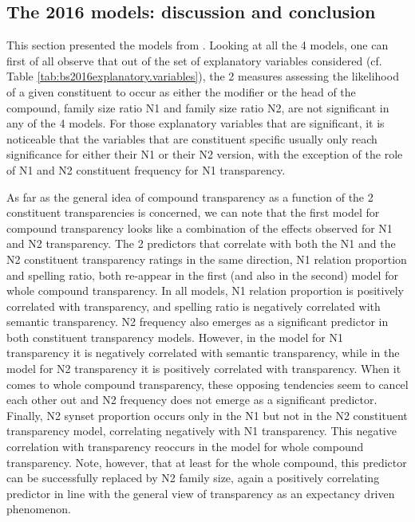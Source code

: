 \subsection{The 2016 models: discussion and conclusion}
\label{sec:bs2016discussionandconclusion}

This section presented the models from
\citet{BellandSchaefer:2016}. Looking at all the 4 models, one can
first of all observe that out of the set of explanatory variables
considered (cf. Table \ref{tab:bs2016explanatory.variables}), the 2
measures assessing the likelihood of a given constituent to occur as
either the modifier or the head of the compound, family size ratio N1
and family size ratio N2, are not significant in any of the 4 models. For those explanatory variables
that are significant, it is noticeable that the variables that are
constituent specific usually only reach significance for either their
N1 or their N2 version, with the exception of the role of N1 and N2
constituent frequency for N1 transparency. 

As far as the general idea of compound transparency as a function of
the 2 constituent transparencies is concerned, we can note that the
first model for compound transparency looks like a combination of the
effects observed for N1 and N2 transparency. 
The 2 predictors that correlate with both the N1 and the N2
constituent transparency ratings in the
same direction, N1 relation proportion and spelling ratio, both re-appear in the
first (and also in the second) model for whole compound
transparency. In all models, N1 relation proportion is positively correlated
with transparency, and spelling ratio is negatively correlated with
semantic transparency. N2 frequency also emerges as a significant
predictor in both constituent transparency models. However, in the
model for N1 transparency it is negatively correlated with semantic
transparency, while in the model for N2 transparency it is positively
correlated with transparency. When it comes to whole compound
transparency, these opposing tendencies seem to cancel each other out and
N2 frequency does not emerge as a significant predictor. Finally, N2
synset proportion occurs only in the N1 but not in the N2 constituent transparency
model, correlating negatively with N1 transparency. This negative
correlation with transparency reoccurs in the model for whole
compound transparency. Note, however, that at least for the whole
compound, this predictor can be successfully replaced by N2 family
size, again a positively correlating predictor in line with the
general view of transparency as an expectancy driven phenomenon.

